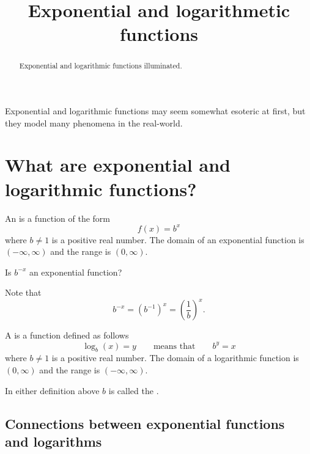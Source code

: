\documentclass{ximera}
\title[Dig-In:]{Exponential and logarithmetic functions}
\begin{document}
\begin{abstract}
  Exponential and logarithmic functions illuminated.
\end{abstract}
\maketitle

Exponential and logarithmic functions may seem somewhat esoteric at
first, but they model many phenomena in the real-world.




\section{What are exponential and logarithmic functions?}


\begin{definition}
  An  is a function of the form
  \[
  f(x) = b^x
  \]
  where  $b\ne 1$ is a positive real number. The domain of an
  exponential function is $(-\infty,\infty)$ and the range is $(0, \infty)$.
\end{definition}

\begin{question}
  Is $b^{-x}$ an exponential function?
  \begin{multipleChoice}
  \end{multipleChoice}
  \begin{feedback}
    Note that
    \[
    b^{-x} = \left(b^{-1}\right)^x = \left(\frac{1}{b}\right)^x.
    \]
  \end{feedback}
\end{question}



\begin{definition}
  A  is a function defined as follows
  \[
  \log_b(x) = y \qquad\text{means that}\qquad b^y = x
  \]
  where  $b\ne 1$ is a positive real number. The domain of a
  logarithmic function is $(0,\infty)$ and the range is $(- \infty, \infty)$.
\end{definition}

In either definition above $b$ is called the .

\subsection{Connections between exponential functions and logarithms}
\end{document}
